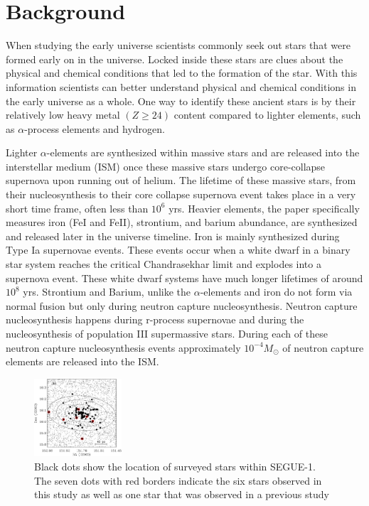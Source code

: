\documentclass{aastex631}
\begin{document}
\section{Background} \label{sec:background}

When studying the early universe scientists commonly seek out stars that were formed early on in the universe.
Locked inside these stars are clues about the physical and chemical conditions that led to the formation of the star.
With this information scientists can better understand physical and chemical conditions in the early universe as a whole.
One way to identify these ancient stars is by their relatively low heavy metal $\left(Z \geq 24\right)$ content compared to
lighter elements, such as $\alpha$-process elements and hydrogen.

Lighter $\alpha$-elements are synthesized within massive stars and are released into the interstellar medium (ISM) once these
massive stars undergo core-collapse supernova upon running out of helium. The lifetime of these massive stars, from their
nucleosynthesis to their core collapse supernova event takes place in a very short time frame, often less than $10^{6}$ yrs.
Heavier elements, the paper specifically measures iron (FeI and FeII), strontium, and barium abundance, are synthesized
and released later in the universe timeline. Iron is mainly synthesized during Type Ia supernovae events. These events occur
when a white dwarf in a binary star system reaches the critical Chandrasekhar limit and explodes into a supernova event.
These white dwarf systems have much longer lifetimes of around $10^{8}$ yrs.
Strontium and Barium, unlike the $\alpha$-elements and iron do not form via normal fusion but only during neutron capture
nucleosynthesis. Neutron capture nucleosynthesis happens during r-process supernovae and during the nucleosynthesis of
population III supermassive stars. During each of these neutron capture nucleosynthesis events approximately
$10^{-4} M_\odot$ of neutron capture elements are released into the ISM.

\begin{figure}
    \begin{center}
        \includegraphics[width=0.29\textwidth]{location.jpg}
    \end{center}
    \caption{Black dots show the location of surveyed stars within SEGUE-1. The seven dots with red borders indicate the six stars
    observed in this study as well as one star that was observed in a previous study}
    \label{fig:loc}
\end{figure}
\end{document}
